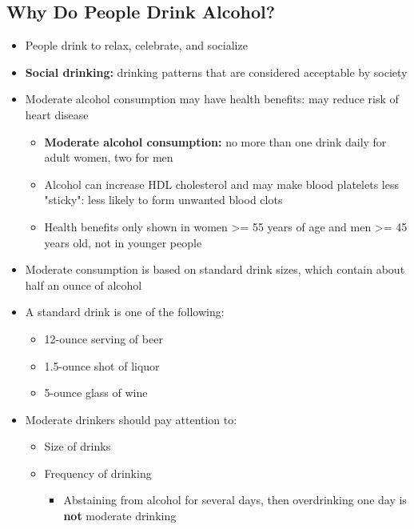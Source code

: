 \documentclass[12pt]{article}
\begin{document}
        \subsection{Why Do People Drink Alcohol?}
            \begin{itemize}
                \item People drink to relax, celebrate, and socialize
                \item \textbf{Social drinking:} drinking patterns that are considered acceptable by society
                \item Moderate alcohol consumption may have health benefits: may reduce risk of heart disease
                    \begin{itemize}
                        \item \textbf{Moderate alcohol consumption:} no more than one drink daily for adult women, two for men
                        \item Alcohol can increase HDL cholesterol and may make blood platelets less "sticky": less likely to form unwanted blood clots
                        \item Health benefits only shown in women >= 55 years of age and men >= 45 years old, not in younger people
                    \end{itemize}
                \item Moderate consumption is based on standard drink sizes, which contain about half an ounce of alcohol
                \item A standard drink is one of the following:
                    \begin{itemize}
                        \item 12-ounce serving of beer
                        \item 1.5-ounce shot of liquor
                        \item 5-ounce glass of wine
                    \end{itemize}
                \item Moderate drinkers should pay attention to:
                    \begin{itemize}
                        \item Size of drinks
                        \item Frequency of drinking
                            \begin{itemize}
                                \item Abstaining from alcohol for several days, then overdrinking one day is \textbf{not} moderate drinking
                            \end{itemize}
                    \end{itemize}
            \end{itemize}
\end{document}
